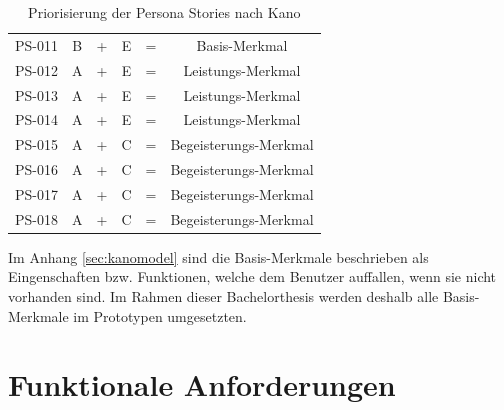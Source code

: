 \begin{table}[h!]
\begin{tabular}{cccccc}
PS-011        & B                                                             & + & E                                                                & = & Basis-Merkmal         \\
PS-012        & A                                                             & + & E                                                                & = & Leistungs-Merkmal     \\
PS-013        & A                                                             & + & E                                                                & = & Leistungs-Merkmal     \\
PS-014        & A                                                             & + & E                                                                & = & Leistungs-Merkmal     \\
PS-015        & A                                                             & + & C                                                                & = & Begeisterungs-Merkmal \\
PS-016        & A                                                             & + & C                                                                & = & Begeisterungs-Merkmal \\
PS-017        & A                                                             & + & C                                                                & = & Begeisterungs-Merkmal \\
PS-018        & A                                                             & + & C                                                                & = & Begeisterungs-Merkmal
\end{tabular}
\caption{Priorisierung der Persona Stories nach Kano}
\end{table}

Im Anhang \ref{sec:kanomodel} sind die Basis-Merkmale beschrieben als Eingenschaften bzw. Funktionen, welche dem Benutzer auffallen, wenn sie nicht vorhanden sind. Im Rahmen dieser Bachelorthesis werden deshalb alle Basis-Merkmale im Prototypen umgesetzten.

\newpage{}
\section{Funktionale Anforderungen}
\label{sec:funktionaleanforderungen}

\begin{usecase}
\end{usecase}

